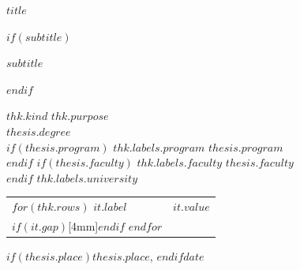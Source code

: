 \begin{titlepage}
\thispagestyle{empty}
\sffamily
\noindent\makebox[0pt][l]{%
  {\color{THRed}\rule{\dimexpr\textwidth/3\relax}{3pt}}%
  {\color{THOrange}\rule{\dimexpr\textwidth/3\relax}{3pt}}%
  {\color{THPurple}\rule{\dimexpr\textwidth/3\relax}{3pt}}}\par

\vfill

{\huge $title$\par}
$if(subtitle)$
\medskip
{\Large $subtitle$\par}
$endif$

\bigskip
\noindent
$thk.kind$ $thk.purpose$\\
\emph{$thesis.degree$}\\
$if(thesis.program)$
$thk.labels.program$ $thesis.program$\\
$endif$
$if(thesis.faculty)$
$thk.labels.faculty$ $thesis.faculty$\\
$endif$
$thk.labels.university$

\vfill

\noindent
\begin{tabular}{@{}ll@{}}
$for(thk.rows)$
$it.label$ & $it.value$\\$if(it.gap)$[4mm]$endif$
$endfor$
\end{tabular}

\vspace{10mm}
\noindent
$if(thesis.place)$$thesis.place$, $endif$$date$
\end{titlepage}


